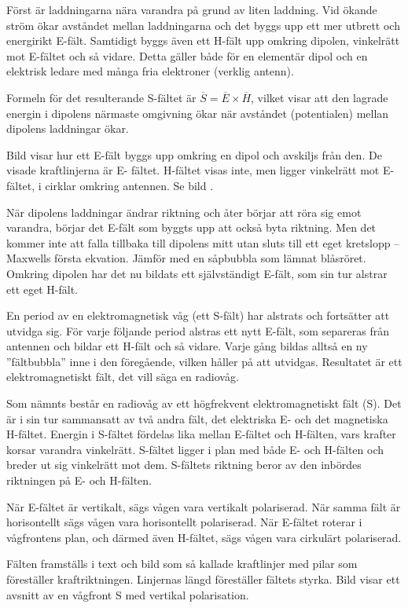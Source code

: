 Först är laddningarna nära varandra på grund av liten laddning.
Vid ökande ström ökar avståndet mellan laddningarna och det byggs upp ett
mer utbrett och energirikt E-fält.
Samtidigt byggs även ett H-fält upp omkring dipolen, vinkelrätt mot E-fältet
och så vidare.
Detta gäller både för en elementär dipol och en elektrisk ledare med många fria
elektroner (verklig antenn).

Formeln för det resulterande S-fältet är \(\overline{S} =
\overline{E}\times\overline{H}\), vilket visar att den lagrade energin
i dipolens närmaste omgivning ökar när avståndet (potentialen) mellan
dipolens laddningar ökar.

Bild  visar hur ett E-fält byggs upp omkring en dipol och
avskiljs från den.
De visade kraftlinjerna är E- fältet.
H-fältet visas inte, men ligger vinkelrätt mot E-fältet, i cirklar omkring
antennen. Se bild .



När dipolens laddningar ändrar riktning och åter börjar att röra sig
emot varandra, börjar det E-fält som byggts upp att också byta riktning.
Men det kommer inte att falla tillbaka till dipolens mitt
utan sluts till ett eget kretslopp -- Maxwells första ekvation.
Jämför med en såpbubbla som lämnat blåsröret.
Omkring dipolen har det nu bildats ett självständigt E-fält, som sin tur
alstrar ett eget H-fält.

En period av en elektromagnetisk våg (ett S-fält) har alstrats och
fortsätter att utvidga sig.
För varje följande period alstras ett nytt E-fält, som separeras från antennen
och bildar ett H-fält och så vidare.
Varje gång bildas alltså en ny ''fältbubbla'' inne i den föregående, vilken
håller på att utvidgas.
Resultatet är ett elektromagnetiskt fält, det vill säga en radiovåg.

Som nämnts består en radiovåg av ett högfrekvent elektromagnetiskt fält (S).
Det är i sin tur sammansatt av två andra fält, det elektriska E-
och det magnetiska H-fältet.
Energin i S-fältet fördelas lika mellan E-fältet och H-fälten,
vars krafter korsar varandra vinkelrätt.
S-fältet ligger i plan med både E- och H-fälten och breder ut sig vinkelrätt
mot dem.
S-fältets riktning beror av den inbördes riktningen på E- och H-fälten.

När E-fältet är vertikalt, sägs vågen vara vertikalt polariserad.
När samma fält är horisontellt sägs vågen vara horisontellt polariserad.
När E-fältet roterar i vågfrontens plan, och därmed även H-fältet, sägs vågen
vara cirkulärt polariserad.

Fälten framställs i text och bild som så kallade kraftlinjer med pilar som
föreställer kraftriktningen.
Linjernas längd föreställer fältets styrka.
Bild  visar ett avsnitt av en vågfront S med vertikal
polarisation.

